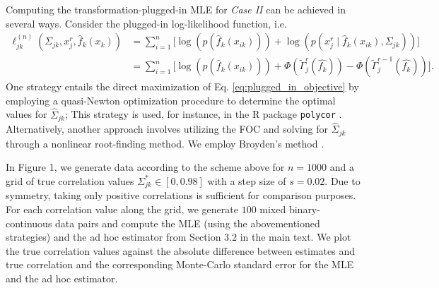 \begin{change}
    Computing the transformation-plugged-in MLE for \textit{Case II} can be achieved in several ways. Consider the plugged-in log-likelihood function, i.e.
    \begin{equation}\label{eq:plugged_in_objective}
        \begin{split}
            \ell_{jk}^{(n)}(\Sigma_{jk}, x_j^r,\hat{f}_k(x_k)) & = \sum_{i=1}^n \big[\log(p(\hat{f}_k(x_{ik}))) + \log(p(x_{j}^{r} \mid \hat{f}_k(x_{ik}), \Sigma_{jk}))\big]                      \\
            & = \sum_{i=1}^n \big[\log(p(\hat{f}_k(x_{ik}))) + \Phi(\tilde{\Gamma}_j^{r}(\hat{f_k})) - \Phi(\tilde{\Gamma}_j^{r-1}(\hat{f_k}))\big].
        \end{split}
    \end{equation}
    One strategy entails the direct maximization of Eq. \eqref{eq:plugged_in_objective} by employing a quasi-Newton optimization procedure to determine the optimal values for $\hat\Sigma_{jk}$; This strategy is used, for instance, in the R package \texttt{polycor} \citep{polycor2022}. Alternatively, another approach involves utilizing the FOC and solving for $\hat\Sigma_{jk}$ through a nonlinear root-finding method. We employ Broyden's method \citep{Broyden1965}.

    In Figure 1, we generate data according to the scheme above for \(n=1000\) and a grid of true correlation values \(\Sigma^*_{jk} \in [0, 0.98]\) with a step size of \(s=0.02\). Due to symmetry, taking only positive correlations is sufficient for comparison purposes. For each correlation value along the grid, we generate \(100\) mixed binary-continuous data pairs and compute the MLE (using the abovementioned strategies) and the ad hoc estimator from Section 3.2 in the main text. We plot the true correlation values against the absolute difference between estimates and true correlation and the corresponding Monte-Carlo standard error for the MLE and the ad hoc estimator.


\end{change}
